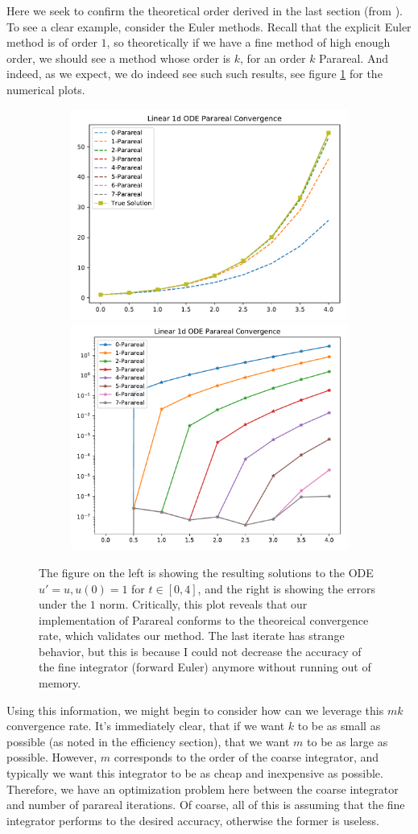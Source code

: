 Here we seek to confirm the theoretical order derived in the last section (from
\cite{balarticle} \cite{fieldstalk}). To see a clear example, consider the Euler
methods. Recall that the explicit Euler method is of order $1$, so theoretically
if we have a fine method of high enough order, we should see a method whose
order is $k$, for an order $k$ Parareal. And indeed, as we expect, we do indeed
see such such results, see figure \ref{fig:conv_fw} for the numerical plots.

\begin{figure}[!htb]
  \centering
  \begin{subfigure}{\textwidth}
    \centering
    \includegraphics[width=.515\textwidth]
      {./resources/converge_fwsols}
    \includegraphics[width=.475\textwidth]
      {./resources/converge_fwerrs}
  \end{subfigure}%
  \caption{The figure on the left is showing the resulting solutions to the ODE
    $u' = u, u(0) = 1$ for $t \in [0, 4]$, and the right is showing the errors
    under the $1$ norm. Critically, this plot reveals that our implementation of
    Parareal conforms to the theoreical convergence rate, which validates our
    method. The last iterate has strange behavior, but this is because I could
    not decrease the accuracy of the fine integrator (forward Euler) anymore
    without running out of memory.}\label{fig:conv_fw}
\end{figure}

Using this information, we might begin to consider how can we leverage this $mk$
convergence rate. It's immediately clear, that if we want $k$ to be as small as
possible (as noted in the efficiency section), that we want $m$ to be as large
as possible. However, $m$ corresponds to the order of the coarse integrator, and
typically we want this integrator to be as cheap and inexpensive as possible.
Therefore, we have an optimization problem here between the coarse integrator
and number of parareal iterations. Of coarse, all of this is assuming that the
fine integrator performs to the desired accuracy, otherwise the former is
useless. 

